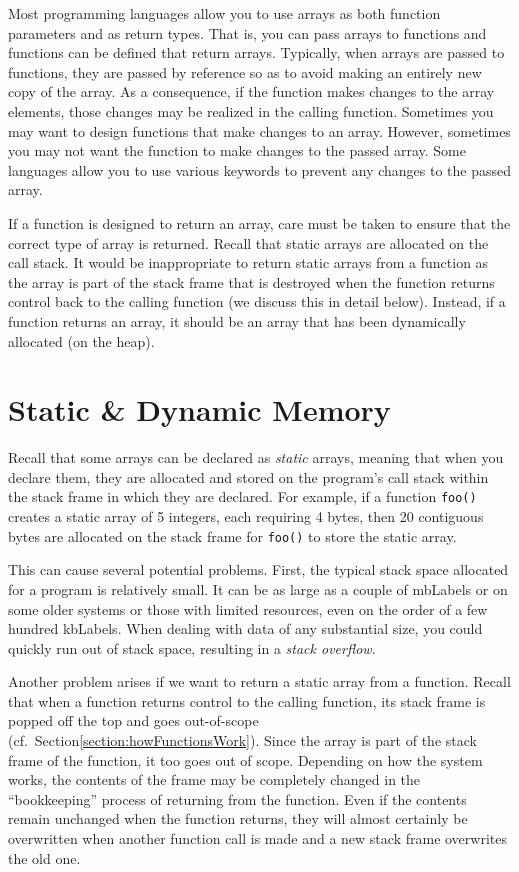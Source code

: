 Most programming languages allow you to use arrays as both function 
parameters and as return types.  That is, you can pass arrays to
functions and functions can be defined that return arrays.  Typically, 
when arrays are passed to functions, they are passed by reference
so as to avoid making an entirely new copy of the array.  As a 
consequence, if the function makes changes to the array elements, 
those changes may be realized in the calling function.  Sometimes 
you may want to design functions that make changes to an array.  
However, sometimes you may not want the function to make
changes to the passed array.  Some languages allow you to use 
various keywords to prevent any changes to the passed array.

If a function is designed to return an array, care must be taken to
ensure that the correct type of array is returned.  Recall that static
arrays are allocated on the call stack.  It would be inappropriate
to return static arrays from a function as the array is part of the
stack frame that is destroyed when the function returns control
back to the calling function (we discuss this in detail below).  
Instead, if a function returns an array, it should be an array that
has been dynamically allocated (on the heap).  

\section{Static \& Dynamic Memory}
\label{section:arraysInDepth}

Recall that some arrays can be declared as \emph{static} arrays,
meaning that when you declare them, they are allocated and
stored on the program's call stack within the stack frame in which
they are declared.  For example, if a function \texttt{foo()}
creates a static array of 5 integers, each requiring 4 bytes, then
20 contiguous bytes are allocated on the stack frame for 
\texttt{foo()} to store the static array.

This can cause several potential problems.  First, the typical 
stack space allocated for a program is relatively small.  It can be as
large as a couple of \glspl{mbLabel} or on some older systems or
those with limited resources, even on the order of a few hundred
\glspl{kbLabel}.  When dealing with data of any substantial
size, you could quickly run out of stack space, resulting in
a \emph{stack overflow}. 

Another problem arises if we want to return a static array from
a function.  Recall that when a function returns control to the 
calling function, its stack frame is popped off the top and 
goes out-of-scope (cf.\ Section\ref{section:howFunctionsWork}).
Since the array is part of the stack frame of the function, it
too goes out of scope.  Depending on how the system works, 
the contents of the frame may be completely changed in the
``bookkeeping'' process of returning from the function.  Even
if the contents remain unchanged when the function returns,
they will almost certainly be overwritten when another function
call is made and a new stack frame overwrites the old one.

